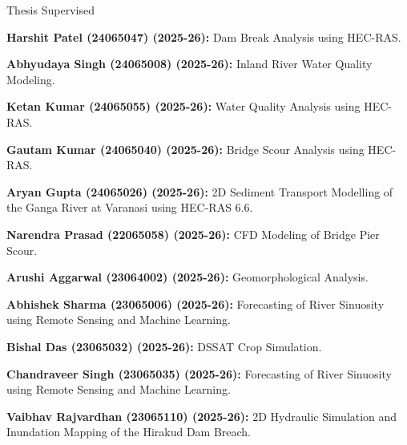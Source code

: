 \begin{rubric}{Thesis Supervised}


\entry*{} \textbf{Harshit Patel (24065047) (2025-26):} Dam Break Analysis using HEC-RAS.

\entry*{} \textbf{Abhyudaya Singh (24065008) (2025-26):} Inland River Water Quality Modeling.

\entry*{} \textbf{Ketan Kumar (24065055) (2025-26):} Water Quality Analysis using HEC-RAS.

\entry*{} \textbf{Gautam Kumar (24065040) (2025-26):} Bridge Scour Analysis using HEC-RAS.

\entry*{} \textbf{Aryan Gupta (24065026) (2025-26):} 2D Sediment Transport Modelling of the Ganga River at Varanasi using HEC-RAS 6.6.

\entry*{} \textbf{Narendra Prasad (22065058) (2025-26):} CFD Modeling of Bridge Pier Scour.

\entry*{} \textbf{Arushi Aggarwal (23064002) (2025-26):} Geomorphological Analysis.

\entry*{} \textbf{Abhishek Sharma (23065006) (2025-26):} Forecasting of River Sinuosity using Remote Sensing and Machine Learning.

\entry*{} \textbf{Bishal Das (23065032) (2025-26):} DSSAT Crop Simulation.

\entry*{} \textbf{Chandraveer Singh (23065035) (2025-26):} Forecasting of River Sinuosity using Remote Sensing and Machine Learning.

\entry*{} \textbf{Vaibhav Rajvardhan (23065110) (2025-26):} 2D Hydraulic Simulation and Inundation Mapping of the Hirakud Dam Breach.


\end{rubric}
